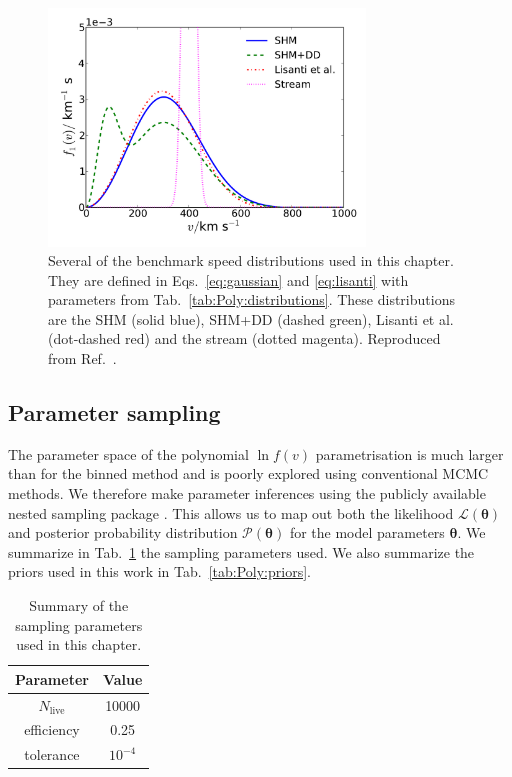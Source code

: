 \begin{figure}[t]
\centering
  \includegraphics[width=0.75\textwidth]{Poly/SpeedDistributions-Ensemble.pdf}
  \caption[Several benchmark speed distributions used to test the polynomial $\ln f(v)$ method.]{Several of the benchmark speed distributions used in this chapter. They are defined in Eqs.~\ref{eq:gaussian} and \ref{eq:lisanti} with parameters from Tab.~\ref{tab:Poly:distributions}. These distributions are the SHM (solid blue), SHM+DD (dashed green), Lisanti et al. (dot-dashed red) and the stream (dotted magenta). Reproduced from Ref.~\cite{Kavanagh:2014}.}
  \label{fig:Poly:Ensemble_distributions}
\end{figure}


\subsection{Parameter sampling}
\label{sec:Poly:ParamRecon}
The parameter space of the polynomial $\ln f(v)$ parametrisation is much larger than for the binned method and is poorly explored using conventional MCMC methods. We therefore make parameter inferences using the publicly available \multinest nested sampling package \cite{Feroz:2007,Feroz:2008,Feroz:2014}. This allows us to map out both the likelihood $\mathcal{L}(\mathbf{\theta})$ and posterior probability distribution $\mathcal{P}(\mathbf{\theta})$ for the model parameters $\mathbf{\theta}$. We summarize in Tab.~\ref{tab:Poly:MultiNest} the \multinest sampling parameters used. We also summarize the priors used in this work in Tab.~\ref{tab:Poly:priors}. 


\begin{table}[t]
  \setlength{\extrarowheight}{2pt}
  \setlength{\tabcolsep}{3pt}
  \begin{center}
	\begin{tabular}{c|c}
        \hline\hline
        Parameter & Value \\
        \hline
	$N_\textrm{live}$ & 10000 \\
	efficiency & 0.25 \\
	tolerance & $10^{-4}$ \\
        \hline\hline
	\end{tabular}
  \end{center}
\caption[Summary of the \multinest sampling parameters used in Chapter \ref{ch:Poly}]{Summary of the \multinest sampling parameters used in this chapter.}
\label{tab:Poly:MultiNest}
\end{table}

